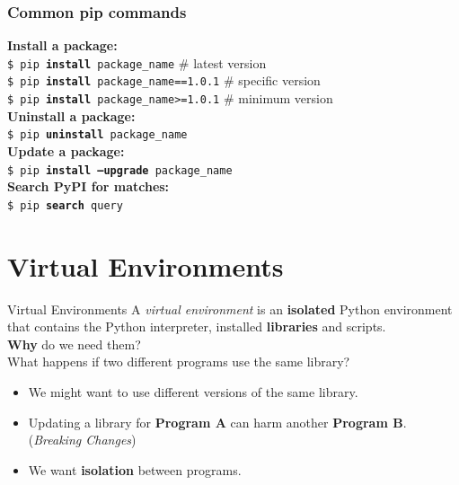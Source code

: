     \begin{frame}
        \frametitle{Common pip commands}
        \LARGE
        \pause
        \textbf{Install a package:}\\
        \pause
        \texttt{\$ pip \textbf{install} package\_name}  \# latest version \\
        \pause
        \texttt{\$ pip \textbf{install} package\_name==1.0.1}  \# specific version \\
        \pause
        \texttt{\$ pip \textbf{install} package\_name>=1.0.1}  \# minimum version \\
        \pause        
        \textbf{Uninstall a package:}\\
        \pause        
        \texttt{\$ pip \textbf{uninstall} package\_name}\\
        \pause
        \textbf{Update a package:}\\
        \pause
        \texttt{\$ pip \textbf{install --upgrade} package\_name}\\
        \pause
        \textbf{Search PyPI for matches:}\\
        \pause
        \texttt{\$ pip \textbf{search} query}
    \end{frame}

    \section{Virtual Environments}

    \begin{frame}{Virtual Environments}
        \LARGE
        \pause
        A \textit{virtual environment} is an \textbf<4->{isolated} Python environment that contains the Python interpreter, installed \textbf<4->{libraries} and scripts.\\
        \pause
        \textbf{Why} do we need them?\\
        \pause
        \pause
        What happens if two different programs use the same library?
        \begin{itemize}
            \pause
            \item We might want to use different versions of the same library.
            \pause
            \item Updating a library for \textbf{Program A} can harm another \textbf{Program B}. (\textit{Breaking Changes})
            \pause
            \item We want \textbf{isolation} between programs.
        \end{itemize}
    \end{frame}

